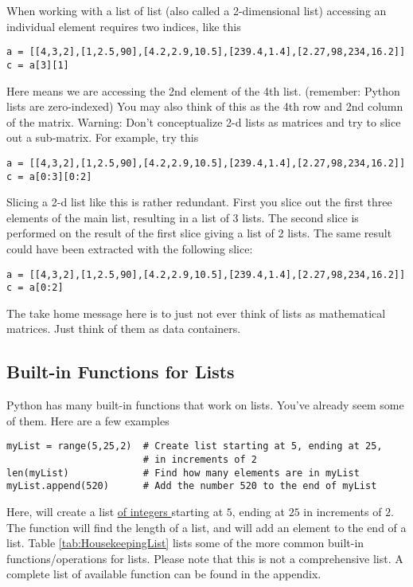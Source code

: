 When working with a list of list (also called a 2-dimensional list)
accessing an individual element requires two indices, like this
\begin{Verbatim}
a = [[4,3,2],[1,2.5,90],[4.2,2.9,10.5],[239.4,1.4],[2.27,98,234,16.2]]
c = a[3][1]
\end{Verbatim}
Here \code{[3][1]} means we are accessing the 2nd element of the 4th
list. (remember: Python lists are zero-indexed) You may also think of
this as the 4th row and 2nd column of the matrix.  Warning: Don't
conceptualize 2-d lists as matrices and try to slice out a
sub-matrix.  For example, try this
\begin{Verbatim}
a = [[4,3,2],[1,2.5,90],[4.2,2.9,10.5],[239.4,1.4],[2.27,98,234,16.2]]
c = a[0:3][0:2]
\end{Verbatim}
Slicing a 2-d list like this is rather redundant.  First you slice out
the first three elements of the main list, resulting in a list of 3
lists.  The second slice is performed on the result of the first
slice giving a list of 2 lists.  The same result could have been
extracted with the following slice:
\begin{Verbatim}
a = [[4,3,2],[1,2.5,90],[4.2,2.9,10.5],[239.4,1.4],[2.27,98,234,16.2]]
c = a[0:2]
\end{Verbatim}
The take home message here is to just not ever think of lists as
mathematical matrices.  Just think of them as data containers.
\subsection*{Built-in Functions for Lists}
Python has many built-in functions that work on lists.  You've already
seem some of them.  Here are a few examples
\begin{Verbatim}
myList = range(5,25,2)  # Create list starting at 5, ending at 25,
                        # in increments of 2
len(myList)             # Find how many elements are in myList
myList.append(520)      # Add the number 520 to the end of myList
\end{Verbatim}
 Here,  will create a list \underline{of integers }
starting at $5$, ending at $25$ in increments of $2$.  The
 function will find the length of a list, and
 will add an element to the end of a list.  Table
\ref{tab:HousekeepingList} lists some of the more common built-in
functions/operations for lists.  Please note that this is not a
comprehensive list.  A complete list of available function can be
found in the appendix.


